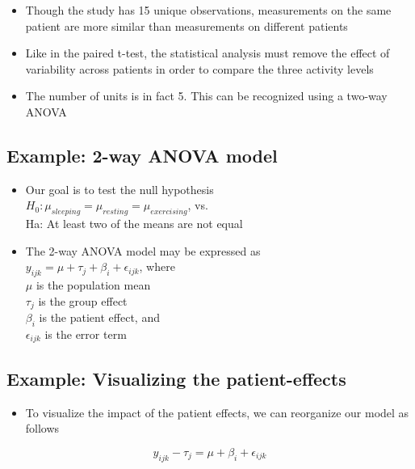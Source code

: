 \documentclass[
]{book}
\providecommand{\tightlist}{%
  \setlength{\itemsep}{0pt}\setlength{\parskip}{0pt}}
\begin{document}
\begin{itemize}
\tightlist
\item
  Though the study has 15 unique observations, measurements on the same patient are more similar than measurements on different patients
\item
  Like in the paired t-test, the statistical analysis must remove the effect of variability across patients in order to compare the three activity levels
\item
  The number of units is in fact 5. This can be recognized using a two-way ANOVA
\end{itemize}

\hypertarget{example-2-way-anova-model}{%
\subsection{Example: 2-way ANOVA model}\label{example-2-way-anova-model}}

\begin{itemize}
\tightlist
\item
  Our goal is to test the null hypothesis\\
  \(H_0:\mu_{sleeping}=\mu_{resting}=\mu_{exercising}\), vs.\\
  Ha: At least two of the means are not equal
\item
  The 2-way ANOVA model may be expressed as\\
  \(y_{ijk}=\mu+\tau_j+\beta_i+\epsilon_{ijk}\), where\\
  \(\mu\) is the population mean\\
  \(\tau_j\) is the group effect\\
  \(\beta_i\) is the patient effect, and\\
  \(\epsilon_{ijk}\) is the error term
\end{itemize}

\hypertarget{example-visualizing-the-patient-effects}{%
\subsection{Example: Visualizing the patient-effects}\label{example-visualizing-the-patient-effects}}

\begin{itemize}
\tightlist
\item
  To visualize the impact of the patient effects, we can reorganize our model as follows
\end{itemize}

\[y_{ijk}-\tau_j=\mu+\beta_i+\epsilon_{ijk}\]
\end{document}
